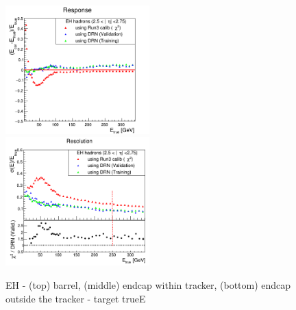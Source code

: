 \begin{figure}
\includegraphics[width=0.495\textwidth]{./plots_pdf/HCAL_plots/Trained_target_ratioflip_0_500_10/pdf/EH_ec_out/EC_outside_tracker_corrEtaEndcapEcalHcal.png}
\includegraphics[width=0.495\textwidth]{./plots_pdf/HCAL_plots/Trained_target_ratioflip_0_500_10/pdf/EH_ec_out/EC_outside_tracker_corrEtaEndcapEcalHcal_reso.png}
\caption[Energy response (resolution) of the PF EH-hadron cluster training traget Etrue]{EH - (top) barrel, (middle) endcap within tracker, (bottom) endcap outside the tracker - target trueE}
\label{fig:EH_trueE}
\end{figure}
